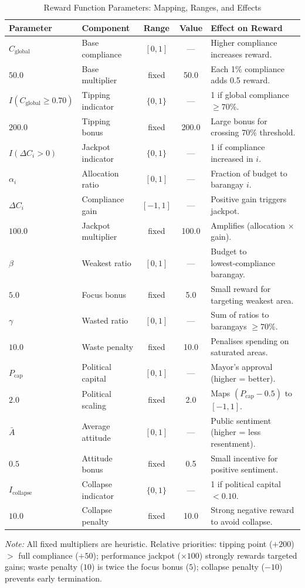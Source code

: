 \begin{table}[htbp]
\centering
\caption{Reward Function Parameters: Mapping, Ranges, and Effects}
\label{tab:reward_parameters}
\small
\begin{tabular}{l l c c p{3.8cm}}
\toprule
\textbf{Parameter} & \textbf{Component} & \textbf{Range} & \textbf{Value} & \textbf{Effect on Reward} \\
\midrule
$C_{\text{global}}$ & Base compliance & $[0,1]$ & — & Higher compliance increases reward. \\
$50.0$ & Base multiplier & fixed & 50.0 & Each 1\% compliance adds 0.5 reward. \\
$I(C_{\text{global}} \ge 0.70)$ & Tipping indicator & $\{0,1\}$ & — & 1 if global compliance $\ge 70\%$. \\
$200.0$ & Tipping bonus & fixed & 200.0 & Large bonus for crossing 70\% threshold. \\
$I(\Delta C_i > 0)$ & Jackpot indicator & $\{0,1\}$ & — & 1 if compliance increased in $i$. \\
$\alpha_i$ & Allocation ratio & $[0,1]$ & — & Fraction of budget to barangay $i$. \\
$\Delta C_i$ & Compliance gain & $[-1,1]$ & — & Positive gain triggers jackpot. \\
$100.0$ & Jackpot multiplier & fixed & 100.0 & Amplifies (allocation $\times$ gain). \\
$\beta$ & Weakest ratio & $[0,1]$ & — & Budget to lowest‑compliance barangay. \\
$5.0$ & Focus bonus & fixed & 5.0 & Small reward for targeting weakest area. \\
$\gamma$ & Wasted ratio & $[0,1]$ & — & Sum of ratios to barangays $\ge 70\%$. \\
$10.0$ & Waste penalty & fixed & 10.0 & Penalises spending on saturated areas. \\
$P_{\text{cap}}$ & Political capital & $[0,1]$ & — & Mayor’s approval (higher = better). \\
$2.0$ & Political scaling & fixed & 2.0 & Maps $(P_{\text{cap}}-0.5)$ to $[-1,1]$. \\
$\bar{A}$ & Average attitude & $[0,1]$ & — & Public sentiment (higher = less resentment). \\
$0.5$ & Attitude bonus & fixed & 0.5 & Small incentive for positive sentiment. \\
$I_{\text{collapse}}$ & Collapse indicator & $\{0,1\}$ & — & 1 if political capital $< 0.10$. \\
$10.0$ & Collapse penalty & fixed & 10.0 & Strong negative reward to avoid collapse. \\
\bottomrule
\end{tabular}
\vspace{0.2cm}

\footnotesize
\textit{Note:} All fixed multipliers are heuristic. Relative priorities: tipping point ($+200$) $>$ full compliance ($+50$); performance jackpot ($\times100$) strongly rewards targeted gains; waste penalty ($10$) is twice the focus bonus ($5$); collapse penalty ($-10$) prevents early termination.
\end{table}